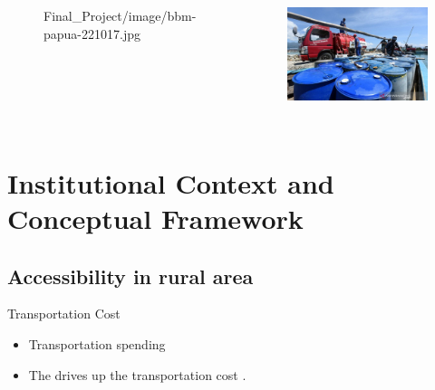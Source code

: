\documentclass[
11pt,notheorems,compress,hyperref={pdfauthor=Maghfira Ramadhani}
]{beamer}
\begin{document}
\begin{frame}
\begin{columns}[T,onlytextwidth]
\begin{figure}[t]
        {Final_Project/image/bbm-papua-221017.jpg}
        \label{f:graph1}
        \end{figure}
    \begin{figure}[t]
        \includegraphics[scale=0.21]
        {Final_Project/image/bbm-satu-harga_1.jpg}
        \label{f:graph2}
        \end{figure}
\end{columns}
\end{frame}

\section{Institutional Context and Conceptual Framework}
\subsection{Accessibility in rural area}
\begin{frame}
\begin{exampleblock}{Transportation Cost}
\begin{itemize}
    \item Transportation spending  \citep{sambodo_2019}
    \item The  drives up the transportation cost \citep{sandee_2016}.
\end{itemize}
\end{exampleblock}
\end{frame}
\end{document}
